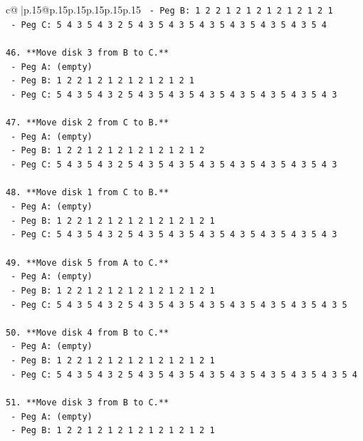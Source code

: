\documentclass{article}
\begin{document}
{\begin{supertabular}{c@{$\;$}|p{.15\linewidth}@{}p{.15\linewidth}p{.15\linewidth}p{.15\linewidth}p{.15\linewidth}p{.15\linewidth}}
{{{\texttt{    {-} Peg B: 1 2 2 1 2 1 2 1 2 1 2 1 2 1} \\
\texttt{    {-} Peg C: 5 4 3 5 4 3 2 5 4 3 5 4 3 5 4 3 5 4 3 5 4 3 5 4 3 5 4} \\
\\ 
\texttt{46. **Move disk 3 from B to C.**} \\
\texttt{    {-} Peg A: (empty)} \\
\texttt{    {-} Peg B: 1 2 2 1 2 1 2 1 2 1 2 1 2 1} \\
\texttt{    {-} Peg C: 5 4 3 5 4 3 2 5 4 3 5 4 3 5 4 3 5 4 3 5 4 3 5 4 3 5 4 3} \\
\\ 
\texttt{47. **Move disk 2 from C to B.**} \\
\texttt{    {-} Peg A: (empty)} \\
\texttt{    {-} Peg B: 1 2 2 1 2 1 2 1 2 1 2 1 2 1 2} \\
\texttt{    {-} Peg C: 5 4 3 5 4 3 2 5 4 3 5 4 3 5 4 3 5 4 3 5 4 3 5 4 3 5 4 3} \\
\\ 
\texttt{48. **Move disk 1 from C to B.**} \\
\texttt{    {-} Peg A: (empty)} \\
\texttt{    {-} Peg B: 1 2 2 1 2 1 2 1 2 1 2 1 2 1 2 1} \\
\texttt{    {-} Peg C: 5 4 3 5 4 3 2 5 4 3 5 4 3 5 4 3 5 4 3 5 4 3 5 4 3 5 4 3} \\
\\ 
\texttt{49. **Move disk 5 from A to C.**} \\
\texttt{    {-} Peg A: (empty)} \\
\texttt{    {-} Peg B: 1 2 2 1 2 1 2 1 2 1 2 1 2 1 2 1} \\
\texttt{    {-} Peg C: 5 4 3 5 4 3 2 5 4 3 5 4 3 5 4 3 5 4 3 5 4 3 5 4 3 5 4 3 5} \\
\\ 
\texttt{50. **Move disk 4 from B to C.**} \\
\texttt{    {-} Peg A: (empty)} \\
\texttt{    {-} Peg B: 1 2 2 1 2 1 2 1 2 1 2 1 2 1 2 1} \\
\texttt{    {-} Peg C: 5 4 3 5 4 3 2 5 4 3 5 4 3 5 4 3 5 4 3 5 4 3 5 4 3 5 4 3 5 4} \\
\\ 
\texttt{51. **Move disk 3 from B to C.**} \\
\texttt{    {-} Peg A: (empty)} \\
\texttt{    {-} Peg B: 1 2 2 1 2 1 2 1 2 1 2 1 2 1 2 1} \\
}}}
\end{supertabular}}
\end{document}
